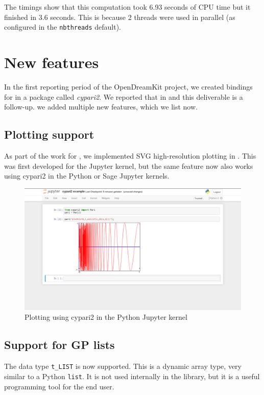 \documentclass{deliverablereport}
\begin{document}
The timings show that this computation took 6.93 seconds of CPU time
but it finished in 3.6 seconds.
This is because 2 threads were used in parallel
(as configured in the \texttt{nbthreads} default).

\section{New features}

In the first reporting period of the OpenDreamKit project,
we created \Python bindings for \PariGP in a package called \emph{cypari2}.
We reported that in  and this deliverable is a follow-up.
we added multiple new features, which we list now.

\subsection{Plotting support}

As part of the work for ,
we implemented SVG high-resolution plotting in \Pari.
This was first developed for the \PariGP Jupyter kernel,
but the same feature now also works using cypari2
in the Python or Sage Jupyter kernels.

\begin{figure}[ht]
  \includegraphics[width=\textwidth,trim={60px 100px 60px 1px},clip]{jupyter-cypari2.png}
  \caption{Plotting using cypari2 in the Python Jupyter kernel}
\end{figure}

\subsection{Support for GP lists}

The \PariGP data type \verb/t_LIST/ is now supported.
This is a dynamic array type, very similar to a Python \verb/list/.
It is not used internally in the \Pari library,
but it is a useful programming tool for the end user.
\end{document}
